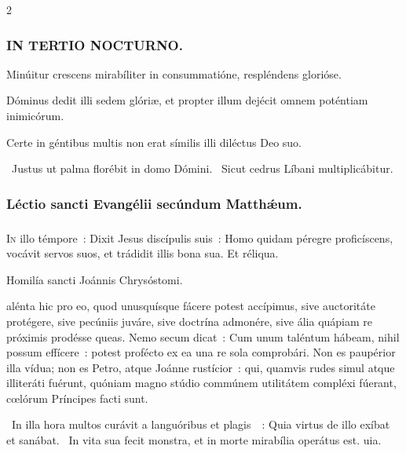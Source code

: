 \documentclass[9pt,twoside]{extarticle}
\begin{document}
\begin{multicols}{2}
{{\subsubsection*{\center \textsc{IN TERTIO NOCTURNO.}}
\begin{tightlist}{}
\item {} Minúitur crescens mirabíliter in consummatióne, respléndens glorióse.
\item {} Dóminus dedit illi sedem glóriæ, et propter illum dejécit omnem poténtiam inimicórum.
\item {} Certe in géntibus multis non erat símilis illi diléctus Deo suo.
\item {}~Justus ut palma florébit in domo Dómini. ~Sicut cedrus Líbani multiplicábitur.
\end{tightlist}

\subsubsection*{\center Léctio sancti Evangélii secúndum Matthǽum.}
\subsubsection*{\center {} \hfill {}}
\lettrine{I}n illo témpore~: Dixit Jesus discípulis suis~: Homo quidam péregre proficíscens, vocávit servos suos, et trádidit illis bona sua. Et réliqua.

\begin{center}Homilía sancti Joánnis Chrysóstomi.\\
\end{center}
alénta hic pro eo, quod unusquísque fácere potest accípimus, sive auctoritáte protégere, sive pecúniis juváre, sive doctrína admonére, sive ália quápiam re próximis prodésse queas. Nemo secum dicat~: Cum unum taléntum hábeam, nihil possum effícere~: potest profécto ex ea una re sola comprobári. Non es paupérior illa vídua; non es Petro, atque Joánne rustícior~: qui, quamvis rudes simul atque illiteráti fuérunt, quóniam magno stúdio commúnem utilitátem compléxi fúerant, cœlórum Príncipes facti sunt.

\begin{tightlist}{}
\item {}~In illa hora multos curávit a languóribus et plagis~~: \textred{*} Quia virtus de illo exíbat et sanábat. ~In vita sua fecit monstra, et in morte mirabília operátus est. uia.
\end{tightlist}

}}
\end{multicols}
\end{document}
